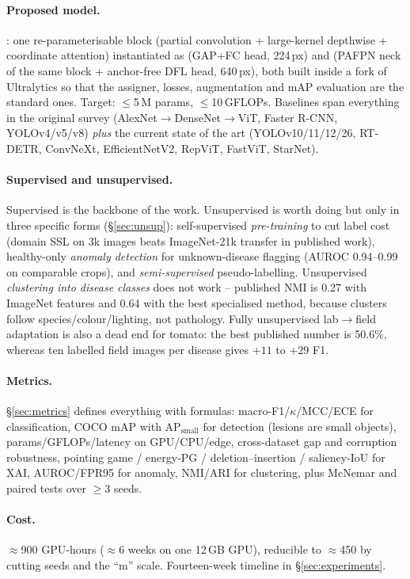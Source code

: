 \paragraph{Proposed model.} \model{}: one re-parameterisable block (partial convolution + large-kernel depthwise + coordinate attention) instantiated as \modelcls{} (GAP+FC head, 224\,px) and \modeldet{} (PAFPN neck of the same block + anchor-free DFL head, 640\,px), both built inside a fork of Ultralytics so that the assigner, losses, augmentation and mAP evaluation are the standard ones. Target: $\le$5\,M params, $\le$10\,GFLOPs. Baselines span everything in the original survey (AlexNet$\to$DenseNet$\to$ViT, Faster R-CNN, YOLOv4/v5/v8) \emph{plus} the current state of the art (YOLOv10/11/12/26, RT-DETR, ConvNeXt, EfficientNetV2, RepViT, FastViT, StarNet).

\paragraph{Supervised and unsupervised.} Supervised is the backbone of the work. Unsupervised is worth doing but only in three specific forms (\S\ref{sec:unsup}): self-supervised \emph{pre-training} to cut label cost (domain SSL on 3k images beats ImageNet-21k transfer in published work), healthy-only \emph{anomaly detection} for unknown-disease flagging (AUROC 0.94--0.99 on comparable crops), and \emph{semi-supervised} pseudo-labelling. Unsupervised \emph{clustering into disease classes} does not work -- published NMI is 0.27 with ImageNet features and 0.64 with the best specialised method, because clusters follow species/colour/lighting, not pathology. Fully unsupervised lab$\to$field adaptation is also a dead end for tomato: the best published number is 50.6\%, whereas ten labelled field images per disease gives $+11$ to $+29$ F1.

\paragraph{Metrics.} \S\ref{sec:metrics} defines everything with formulas: macro-F1/$\kappa$/MCC/ECE for classification, COCO mAP with AP$_\text{small}$ for detection (lesions are small objects), params/GFLOPs/latency on GPU/CPU/edge, cross-dataset gap and corruption robustness, pointing game / energy-PG / deletion--insertion / saliency-IoU for XAI, AUROC/FPR95 for anomaly, NMI/ARI for clustering, plus McNemar and paired tests over $\ge$3 seeds.

\paragraph{Cost.} $\approx$900 GPU-hours ($\approx$6 weeks on one 12\,GB GPU), reducible to $\approx$450 by cutting seeds and the ``m'' scale. Fourteen-week timeline in \S\ref{sec:experiments}.

